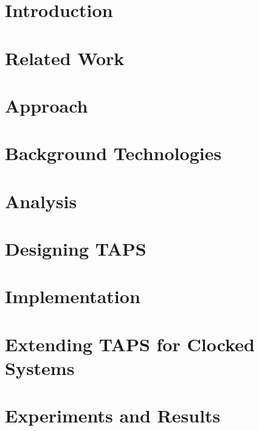 \documentclass[a4paper]{report}
\begin{document}
\newpage
\tableofcontents

\newpage
{}


\chapter{Introduction}

%
\chapter{Related Work}
\label{chap:related_work}


\chapter{Approach}


\chapter{Background Technologies}
\label{chap:background}


\chapter{Analysis}
\label{chap:analysis}


\chapter{Designing TAPS}
\label{chap:design}


\chapter{Implementation}
\label{chap:implementation}


\chapter{Extending TAPS for Clocked Systems}
\label{chap:clock}

%
\chapter{Experiments and Results}
\label{chap:exp}

%
\end{document}
